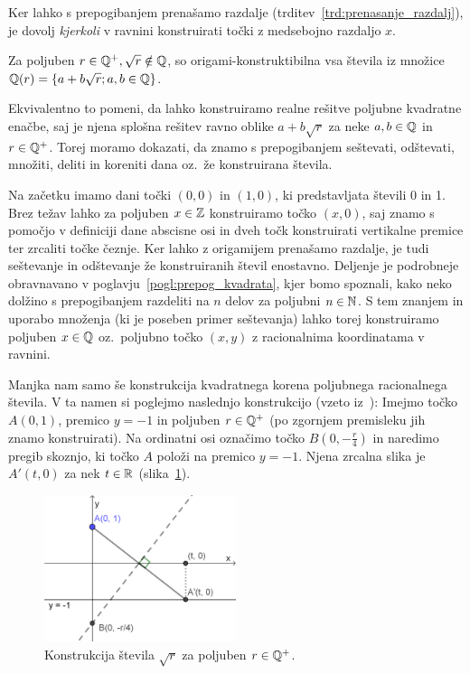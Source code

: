 \begin{opomba}
    Ker lahko s prepogibanjem prenašamo razdalje (trditev~\ref{trd:prenasanje_razdalj}), je dovolj \emph{kjerkoli} v ravnini konstruirati točki z medsebojno razdaljo $x$.
\end{opomba}

\begin{izrek}
    \label{izr:origami_konstruktibilnost}
    Za poljuben $r \in \mathbb Q^{+}, \sqrt{r} \notin \mathbb Q$, so origami-konstruktibilna vsa števila iz množice $\mathbb Q(r) = \{a + b\sqrt{r}; a, b \in \mathbb Q\}$.
\end{izrek}

\begin{dokaz}
    Ekvivalentno to pomeni, da lahko konstruiramo realne rešitve poljubne kvadratne enačbe, saj je njena splošna rešitev ravno oblike $a + b\sqrt{r} $ za neke $ a, b \in \mathbb Q$ in $r \in \mathbb Q^{+}$. Torej moramo dokazati, da znamo s prepogibanjem seštevati, odštevati, množiti, deliti in koreniti dana oz.\ že konstruirana števila.
    
    Na začetku imamo dani točki $(0, 0)$ in $(1, 0)$, ki predstavljata števili 0 in 1. Brez težav lahko za poljuben $x \in \mathbb Z$ konstruiramo točko $(x, 0)$, saj znamo s pomočjo v definiciji dane abscisne osi in dveh točk konstruirati vertikalne premice ter zrcaliti točke čeznje. Ker lahko z origamijem prenašamo razdalje, je tudi seštevanje in odštevanje že konstruiranih števil enostavno. Deljenje je podrobneje obravnavano v poglavju~\ref{pogl:prepog_kvadrata}, kjer bomo spoznali, kako neko dolžino s prepogibanjem razdeliti na $n$ delov za poljubni $n \in \mathbb N$. S tem znanjem in uporabo množenja (ki je poseben primer seštevanja) lahko torej konstruiramo poljuben $x \in \mathbb Q$ oz.\ poljubno točko $(x, y)$ z racionalnima koordinatama v ravnini.
    
    Manjka nam samo še konstrukcija kvadratnega korena poljubnega racionalnega števila. V ta namen si poglejmo naslednjo konstrukcijo (vzeto iz~\cite[str.\ 58]{hull2013}):
    Imejmo točko $A (0, 1) $, premico $y = -1$ in poljuben $r \in \mathbb Q^{+}$ (po zgornjem premisleku jih znamo konstruirati). Na ordinatni osi označimo točko $B (0, -\frac{r}{4})$ in naredimo pregib skoznjo, ki točko $A$ položi na premico $y = -1$. Njena zrcalna slika je $A' (t, 0) $ za nek $t \in \mathbb R$ (slika~\ref{fig:konstrukcija_korena}).
    
    \begin{figure}[h]
        \centering
        \includegraphics[width=0.5\textwidth]{images/kvadratni_koren.png}
        \caption[Konstrukcija korena]{Konstrukcija števila $\sqrt{r}$ za poljuben $r \in \mathbb Q^{+}$.}
        \label{fig:konstrukcija_korena}
    \end{figure}
    

\end{dokaz}
